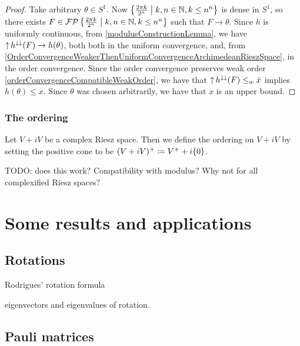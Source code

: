 \begin{proof}
Take arbitrary $\theta\in S^1$. Now $\setbuilder{\frac{2\pi k}{2^n}}{k,n\in\N, k\leq n^n}$ is dense in $S^1$, so there exists $F\in \powerfilters\setbuilder{\frac{2\pi k}{2^n}}{k,n\in\N, k\leq n^n}$ such that $F\to \theta$. Since $h$ is uniformly continuous, from \ref{modulusConstructionLemma},  we have $\operatorname{\uparrow} h^{\downarrow\downarrow}(F) \to h(\theta)$, both both in the uniform convergence, and, from \ref{OrderConvergenceWeakerThenUniformConvergenceArchimedeanRieszSpace}, in the order convergence. Since the order convergence preserves weak order \ref{orderConvergenceCompatibleWeakOrder}, we have that $\operatorname{\uparrow} h^{\downarrow\downarrow}(F) \leq_w \dot{x}$ implies $h(\theta) \leq x$. Since $\theta$ was chosen arbitrarily, we have that $x$ is an upper bound.
\end{proof}

\subsection{The ordering}
\begin{definition}
Let $V+iV$ be a complex Riesz space. Then we define the ordering on $V+iV$ by setting the positive cone to be $(V+iV)^+ \coloneqq V^++i\{0\}$.
\end{definition}
TODO: does this work? Compatibility with modulus? Why not for all complexified Riesz spaces?


\chapter{Some results and applications}
\section{Rotations}
Rodrigues' rotation formula

eigenvectors and eigenvalues of rotation.
\section{Pauli matrices}

